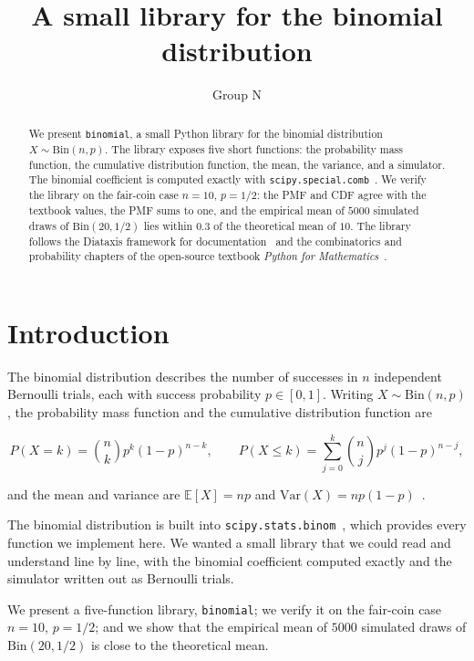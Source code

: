\documentclass[11pt]{article}
\title{A small library for the binomial distribution}
\author{Group N}
\date{}
\begin{document}
\maketitle

\begin{abstract}
We present \texttt{binomial}, a small Python library for the binomial
distribution \(X \sim \text{Bin}(n, p)\). The library exposes five
short functions: the probability mass function, the cumulative
distribution function, the mean, the variance, and a simulator. The
binomial coefficient is computed exactly with
\texttt{scipy.special.comb}~\cite{virtanen2020}. We verify the
library on the fair-coin case \(n = 10\), \(p = 1/2\): the PMF and
CDF agree with the textbook values, the PMF sums to one, and the
empirical mean of \(5000\) simulated draws of \(\text{Bin}(20, 1/2)\)
lies within \(0.3\) of the theoretical mean of \(10\). The library
follows the Diataxis framework for documentation~\cite{procida2017}
and the combinatorics and probability chapters of the open-source
textbook \emph{Python for Mathematics}~\cite{knight2024}.
\end{abstract}

\section{Introduction}

The binomial distribution describes the number of successes in \(n\)
independent Bernoulli trials, each with success probability
\(p \in [0, 1]\). Writing \(X \sim \text{Bin}(n, p)\), the
probability mass function and the cumulative distribution function
are

\[
    P(X = k) = \binom{n}{k} p^k (1 - p)^{n - k},
    \qquad
    P(X \le k) = \sum_{j = 0}^{k} \binom{n}{j} p^j (1 - p)^{n - j},
\]

and the mean and variance are \(\mathbb{E}[X] = n p\) and
\(\text{Var}(X) = n p (1 - p)\)~\cite{ross2014}.

The binomial distribution is built into
\texttt{scipy.stats.binom}~\cite{virtanen2020}, which provides every
function we implement here. We wanted a small library that we could
read and understand line by line, with the binomial coefficient
computed exactly and the simulator written out as Bernoulli trials.

We present a five-function library,
\texttt{binomial}; we verify it on the fair-coin case \(n = 10\),
\(p = 1/2\); and we show that the empirical mean of \(5000\)
simulated draws of \(\text{Bin}(20, 1/2)\) is close to the
theoretical mean.
\end{document}
